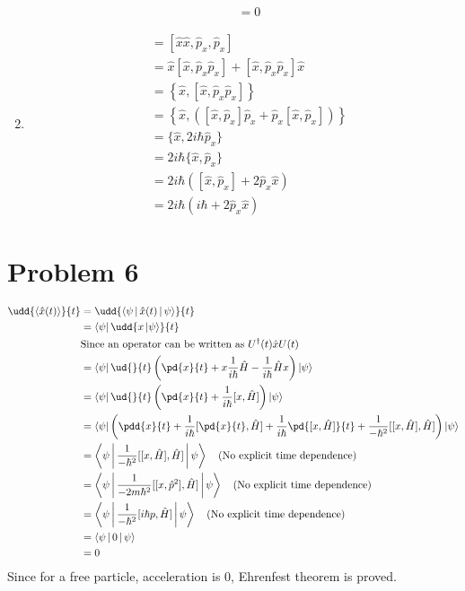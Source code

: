 \documentclass[12pt]{article}
\begin{document}
\begin{enumerate}
\begin{align*}
&=\boxed{0}
\end{align*}
\item \begin{align*}
[\hat x^2,\hat p_x^2] &= [\hat x \hat x, \hat p_x,\hat p_x]\\
&= \hat x[\hat x,\hat p_x\hat p_x]+[\hat x,\hat p_x\hat p_x]\hat x\\
&=\left\{\hat x,[\hat x,\hat p_x\hat p_x] \right\}\\
&=\left\{\hat x,([\hat x,\hat p_x]\hat p_x +\hat p_x[\hat x,\hat p_x])\right\}\\
&=\{\hat x, 2i\hbar\hat p_x\}\\
&=2i\hbar \{\hat x,\hat p_x\}\\
&= 2i\hbar ([\hat x,\hat p_x]+2\hat p_x\hat x)\\
&= 2i\hbar(i\hbar + 2\hat p_x\hat x)
\end{align*}
\end{enumerate}
\section*{Problem 6}
\begin{align*}
\udd{\Braket{\hat x(t)}}{t}&=\udd{\Braket{\psi | \hat x(t) |\psi}}{t}\\
&=\Bra{\psi} \udd{x\Ket{\psi}}{t}\\
&\text{Since an operator can be written as }  U^{\dagger}(t)\hat xU(t)\\
&= \Bra{\psi}\ud{}{t}\left(\pd{x}{t}+x\frac1{i\hbar} \hat H-\frac1{i\hbar}\hat H x \right)\Ket{\psi}\\
&=\Bra{\psi}\ud{}{t}\left(\pd{x}{t}+\frac1{i\hbar}[x,\hat H]\right)\Ket{\psi}\\
&= \Bra{\psi}\left(\pdd{x}{t}+\frac{1}{i\hbar}[\pd{x}{t},\hat H] + \frac{1}{i\hbar}\pd{[x,\hat H]}{t}+\frac{1}{-\hbar^2}[[x,\hat H],\hat H]\right)\Ket{\psi}\\
&=\Braket{\psi|\frac{1}{-\hbar^2}[[x,\hat H],\hat H]|\psi}\quad  \text{(No explicit time dependence)}\\
&=\Braket{\psi|\frac{1}{-2m\hbar^2}[[x,\hat p^2],\hat H]|\psi}\quad  \text{(No explicit time dependence)}\\
&=\Braket{\psi|\frac{1}{-\hbar^2}[i\hbar p ,\hat H]|\psi}\quad  \text{(No explicit time dependence)}\\
&= \Braket{\psi|0|\psi}\\
&= 0
\end{align*}
Since for a free particle, acceleration is 0, Ehrenfest theorem is proved.
\end{document}
